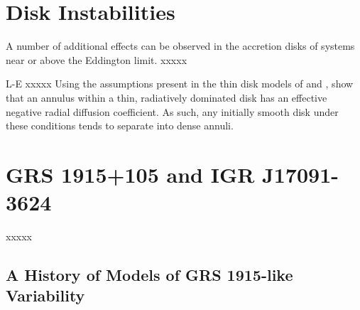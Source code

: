 \section{Disk Instabilities}

\par A number of additional effects can be observed in the accretion disks of systems near or above the Eddington limit. xxxxx

\label{sec:diskinstab}

L-E xxxxx Using the assumptions present in the thin disk models of \citealp{Shakura_Disk} and \citealp{Novikov_Torque}, \citealp{Lightman_Instability} show that an annulus within a thin, radiatively dominated disk has an effective negative radial diffusion coefficient.  As such, any initially smooth disk under these conditions tends to separate into dense annuli.

\section{GRS 1915+105 and IGR J17091-3624}

xxxxx

\subsection{A History of Models of GRS 1915-like Variability}


